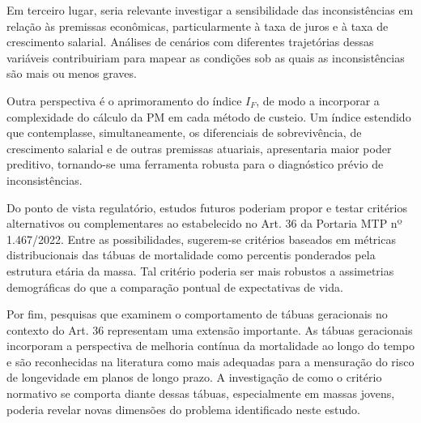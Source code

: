 Em terceiro lugar, seria relevante investigar a sensibilidade das inconsistências em relação às premissas econômicas, particularmente à taxa de juros e à taxa de crescimento salarial. Análises de cenários com diferentes trajetórias dessas variáveis contribuiriam para mapear as condições sob as quais as inconsistências são mais ou menos graves.

Outra perspectiva é o aprimoramento do índice $I_F$, de modo a incorporar a complexidade do cálculo da PM em cada método de custeio. Um índice estendido que contemplasse, simultaneamente, os diferenciais de sobrevivência, de crescimento salarial e de outras premissas atuariais, apresentaria maior poder preditivo, tornando-se uma ferramenta robusta para o diagnóstico prévio de inconsistências.

Do ponto de vista regulatório, estudos futuros poderiam propor e testar critérios alternativos ou complementares ao estabelecido no Art. 36 da Portaria MTP nº 1.467/2022. Entre as possibilidades, sugerem-se critérios baseados em métricas distribucionais das tábuas de mortalidade como percentis ponderados pela estrutura etária da massa. Tal critério poderia ser mais robustos a assimetrias demográficas do que a comparação pontual de expectativas de vida.

Por fim, pesquisas que examinem o comportamento de tábuas geracionais no contexto do Art. 36 representam uma extensão importante. As tábuas geracionais incorporam a perspectiva de melhoria contínua da mortalidade ao longo do tempo e são reconhecidas na literatura como mais adequadas para a mensuração do risco de longevidade em planos de longo prazo. A investigação de como o critério normativo se comporta diante dessas tábuas, especialmente em massas jovens, poderia revelar novas dimensões do problema identificado neste estudo.